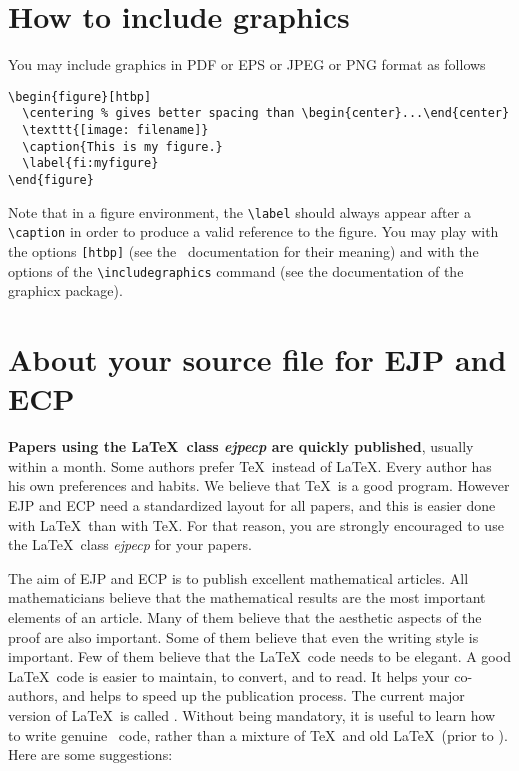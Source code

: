 \documentclass[ECP]{ejpecp} %
\begin{document}
\section{How to include graphics}

You may include graphics in PDF or EPS or JPEG or PNG format as follows

\begin{verbatim}
\begin{figure}[htbp]
  \centering % gives better spacing than \begin{center}...\end{center}
  \texttt{[image: filename]}
  \caption{This is my figure.}
  \label{fi:myfigure}
\end{figure}
\end{verbatim}

Note that in a figure environment, the \verb+\label+ should always appear
after a \verb+\caption+ in order to produce a valid reference to the figure.
You may play with the options \verb+[htbp]+ (see the \LaTeXe\ documentation
for their meaning) and with the options of the \verb+\includegraphics+ command
(see the documentation of the graphicx package).

\section{About your source file for EJP and ECP}

\textbf{Papers using the \LaTeX\ class \emph{ejpecp} are quickly published},
usually within a month. Some authors prefer \TeX\ instead of \LaTeX. Every
author has his own preferences and habits. We believe that \TeX\ is a good
program. However EJP and ECP need a standardized layout for all papers, and
this is easier done with \LaTeX\ than with \TeX. For that reason, you are
strongly encouraged to use the \LaTeX\ class \emph{ejpecp} for your papers.

The aim of EJP and ECP is to publish excellent mathematical articles. All
mathematicians believe that the mathematical results are the most important
elements of an article. Many of them believe that the aesthetic aspects of the
proof are also important. Some of them believe that even the writing style is
important. Few of them believe that the \LaTeX\ code needs to be elegant. A
good \LaTeX\ code is easier to maintain, to convert, and to read. It helps
your co-authors, and helps to speed up the publication process. The current
major version of \LaTeX\ is called \LaTeXe. Without being mandatory, it is
useful to learn how to write genuine \LaTeXe\ code, rather than a mixture of
\TeX\ and old \LaTeX\ (prior to \LaTeXe). Here are some suggestions:
\end{document}
